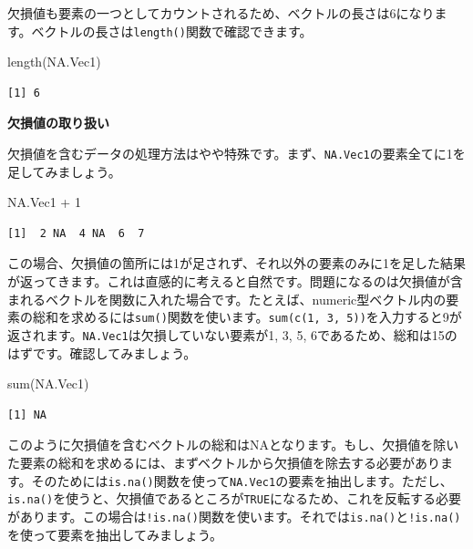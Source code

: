 \documentclass[
  a4paper,
  pandoc,
  ja=standard,
  jafont=haranoaji]{bxjsbook}
\newenvironment{Shaded}{\begin{snugshade}}{\end{snugshade}}
\newcommand{\DecValTok}[1]{\textcolor[rgb]{0.68,0.00,0.00}{#1}}
\newcommand{\FunctionTok}[1]{\textcolor[rgb]{0.28,0.35,0.67}{#1}}
\newcommand{\NormalTok}[1]{\textcolor[rgb]{0.00,0.48,0.65}{#1}}
\newcommand{\SpecialCharTok}[1]{\textcolor[rgb]{0.37,0.37,0.37}{#1}}
\begin{document}
欠損値も要素の一つとしてカウントされるため、ベクトルの長さは6になります。ベクトルの長さは\texttt{length()}関数で確認できます。

\begin{Shaded}
\begin{Highlighting}[numbers=left,,]
\FunctionTok{length}\NormalTok{(NA.Vec1)}
\end{Highlighting}
\end{Shaded}

\begin{verbatim}
[1] 6
\end{verbatim}

\textbf{欠損値の取り扱い}

欠損値を含むデータの処理方法はやや特殊です。まず、\texttt{NA.Vec1}の要素全てに1を足してみましょう。

\begin{Shaded}
\begin{Highlighting}[numbers=left,,]
\NormalTok{NA.Vec1 }\SpecialCharTok{+} \DecValTok{1}
\end{Highlighting}
\end{Shaded}

\begin{verbatim}
[1]  2 NA  4 NA  6  7
\end{verbatim}

この場合、欠損値の箇所には1が足されず、それ以外の要素のみに1を足した結果が返ってきます。これは直感的に考えると自然です。問題になるのは欠損値が含まれるベクトルを関数に入れた場合です。たとえば、numeric型ベクトル内の要素の総和を求めるには\texttt{sum()}関数を使います。\texttt{sum(c(1,\ 3,\ 5))}を入力すると9が返されます。\texttt{NA.Vec1}は欠損していない要素が1,
3, 5, 6であるため、総和は15のはずです。確認してみましょう。

\begin{Shaded}
\begin{Highlighting}[numbers=left,,]
\FunctionTok{sum}\NormalTok{(NA.Vec1)}
\end{Highlighting}
\end{Shaded}

\begin{verbatim}
[1] NA
\end{verbatim}

このように欠損値を含むベクトルの総和はNAとなります。もし、欠損値を除いた要素の総和を求めるには、まずベクトルから欠損値を除去する必要があります。そのためには\texttt{is.na()}関数を使って\texttt{NA.Vec1}の要素を抽出します。ただし、\texttt{is.na()}を使うと、欠損値であるところが\texttt{TRUE}になるため、これを反転する必要があります。この場合は\texttt{!is.na()}関数を使います。それでは\texttt{is.na()}と\texttt{!is.na()}を使って要素を抽出してみましょう。
\end{document}

